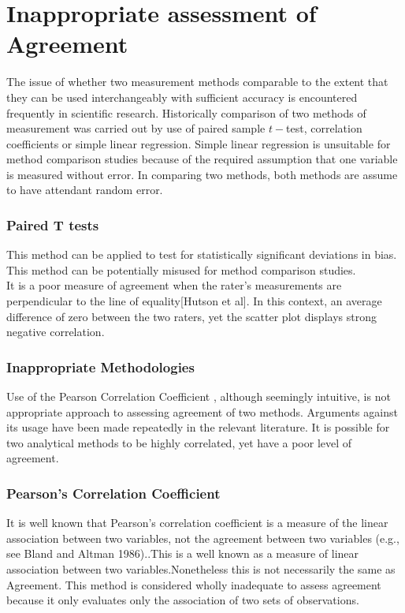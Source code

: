 \documentclass[MAIN.tex]{subfiles}
\begin{document}
	
\section{Inappropriate assessment of Agreement}
The issue of whether two measurement methods comparable to the
extent that they can be used interchangeably with sufficient
accuracy is encountered frequently in scientific research.
Historically comparison of two methods of measurement was carried
out by use of paired sample $t-$test, correlation coefficients or
simple linear regression. Simple linear regression is unsuitable for method comparison studies because of the required assumption that one variable is measured without error. In comparing two methods, both methods are assume to have attendant random error.

\subsubsection{Paired T tests} This method can be applied to test for
	statistically significant deviations in bias. This method can be
	potentially misused for method comparison studies.
	\\It is a poor measure of agreement when the rater's measurements
	are perpendicular to the line of equality[Hutson et al]. In this
	context, an average difference of zero between the two raters, yet
	the scatter plot displays strong negative correlation.
	\subsubsection{Inappropriate Methodologies} Use of the Pearson
	Correlation Coefficient , although seemingly intuitive, is not
	appropriate approach to assessing agreement of two methods.
	Arguments against its usage have been made repeatedly in the
	relevant literature. It is possible for two analytical methods to
	be highly correlated, yet have a poor level of agreement.
	\subsubsection{Pearson's Correlation Coefficient} It is well known that
	Pearson's correlation coefficient is a measure of the linear
	association between two variables, not the agreement between two
	variables (e.g., see Bland and Altman 1986)..This is a well known
	as a measure of linear association between two
	variables.Nonetheless this is not necessarily the same as
	Agreement. This method is considered wholly inadequate to assess
	agreement because it only evaluates only the association of two
	sets of observations.
	
\end{document}

